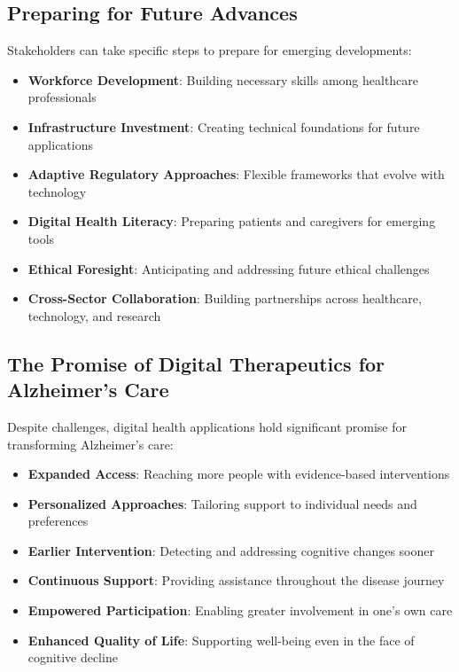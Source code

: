 \subsection{Preparing for Future Advances}
Stakeholders can take specific steps to prepare for emerging developments:

\begin{itemize}
    \item \textbf{Workforce Development}: Building necessary skills among healthcare professionals
    
    \item \textbf{Infrastructure Investment}: Creating technical foundations for future applications
    
    \item \textbf{Adaptive Regulatory Approaches}: Flexible frameworks that evolve with technology
    
    \item \textbf{Digital Health Literacy}: Preparing patients and caregivers for emerging tools
    
    \item \textbf{Ethical Foresight}: Anticipating and addressing future ethical challenges
    
    \item \textbf{Cross-Sector Collaboration}: Building partnerships across healthcare, technology, and research
\end{itemize}

\subsection{The Promise of Digital Therapeutics for Alzheimer's Care}
Despite challenges, digital health applications hold significant promise for transforming Alzheimer's care:

\begin{itemize}
    \item \textbf{Expanded Access}: Reaching more people with evidence-based interventions
    
    \item \textbf{Personalized Approaches}: Tailoring support to individual needs and preferences
    
    \item \textbf{Earlier Intervention}: Detecting and addressing cognitive changes sooner
    
    \item \textbf{Continuous Support}: Providing assistance throughout the disease journey
    
    \item \textbf{Empowered Participation}: Enabling greater involvement in one's own care
    
    \item \textbf{Enhanced Quality of Life}: Supporting well-being even in the face of cognitive decline
\end{itemize}

